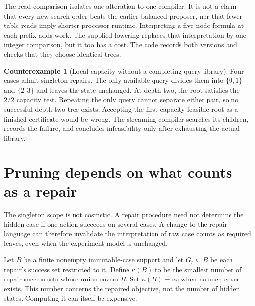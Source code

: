 \documentclass[11pt,letterpaper]{article}
\theoremstyle{plain}
\theoremstyle{definition}
\newtheorem{counterexample}[theorem]{Counterexample}
\begin{document}
The read comparison isolates one alteration to one compiler. It is not a claim that every new search order beats the earlier balanced proposer, nor that fewer table reads imply shorter processor runtime. Interpreting a five-node formula at each prefix adds work. The supplied lowering replaces that interpretation by one integer comparison, but it too has a cost. The code records both versions and checks that they choose identical trees.

\begin{counterexample}[Local capacity without a completing query library]\label{ex:local-capacity}
Four cases admit singleton repairs. The only available query divides them into $\{0,1\}$ and $\{2,3\}$ and leaves the state unchanged. At depth two, the root satisfies the $2/2$ capacity test. Repeating the only query cannot separate either pair, so no successful depth-two tree exists. Accepting the first capacity-feasible root as a finished certificate would be wrong. The streaming compiler searches its children, records the failure, and concludes infeasibility only after exhausting the actual library.
\end{counterexample}

\section{Pruning depends on what counts as a repair}\label{sec:repair-cover}
The singleton scope is not cosmetic. A repair procedure need not determine the hidden case if one action succeeds on several cases. A change to the repair language can therefore invalidate the interpretation of raw case counts as required leaves, even when the experiment model is unchanged.

Let $B$ be a finite nonempty immutable-case support and let $G_r\subseteq B$ be each repair's success set restricted to it. Define $\kappa(B)$ to be the smallest number of repair-success sets whose union covers $B$. Set $\kappa(B)=\infty$ when no such cover exists. This number concerns the repaired objective, not the number of hidden states. Computing it can itself be expensive.
\end{document}
